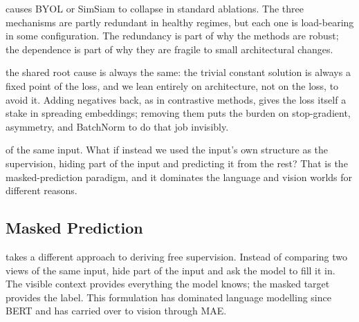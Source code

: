  causes BYOL or SimSiam to collapse in standard ablations.
The three mechanisms are partly redundant in healthy regimes, but each one is load-bearing in some configuration.
The redundancy is part of why the methods are robust; the dependence is part of why they are fragile to small architectural changes.


 the shared root cause is always the same: the trivial constant solution is always a fixed point of the loss, and we lean entirely on architecture, not on the loss, to avoid it.
Adding negatives back, as in contrastive methods, gives the loss itself a stake in spreading embeddings; removing them puts the burden on stop-gradient, asymmetry, and BatchNorm to do that job invisibly.

 of the same input.
What if instead we used the input's own structure as the supervision, hiding part of the input and predicting it from the rest?
That is the masked-prediction paradigm, and it dominates the language and vision worlds for different reasons.


\subsection{Masked Prediction}


 takes a different approach to deriving free supervision.
Instead of comparing two views of the same input, hide part of the input and ask the model to fill it in.
The visible context provides everything the model knows; the masked target provides the label.
This formulation has dominated language modelling since BERT and has carried over to vision through MAE.

\vspace{1.5em}

